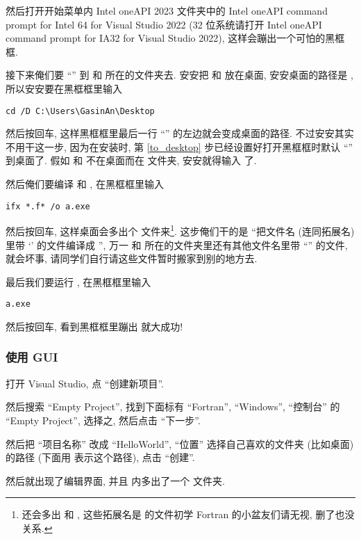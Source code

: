 然后打开开始菜单内 Intel oneAPI 2023 文件夹中的 Intel oneAPI command prompt for Intel 64 for Visual Studio 2022 (32 位系统请打开 Intel oneAPI command prompt for IA32 for Visual Studio 2022), 这样会蹦出一个可怕的黑框框.

接下来俺们要 ``'' 到  和  所在的文件夹去. 安安把  和  放在桌面, 安安桌面的路径是 , 所以安安要在黑框框里输入
\begin{verbatim}
cd /D C:\Users\GasinAn\Desktop
\end{verbatim}
然后按回车, 这样黑框框里最后一行 ``\ttt{>}'' 的左边就会变成桌面的路径. 不过安安其实不用干这一步, 因为在安装时, 第 \ref{to_desktop} 步已经设置好打开黑框框时默认 ``'' 到桌面了. 假如  和  不在桌面而在  文件夹, 安安就得输入  了.

然后俺们要编译  和 , 在黑框框里输入
\begin{verbatim}
ifx *.f* /o a.exe
\end{verbatim}
然后按回车, 这样桌面会多出个  文件来\footnote{还会多出  和 , 这些拓展名是  的文件初学 Fortran 的小盆友们请无视, 删了也没关系.}. 这步俺们干的是 ``把文件名 (连同拓展名) 里带 `' 的文件编译成 '', 万一  和  所在的文件夹里还有其他文件名里带 ``'' 的文件, 就会坏事, 请同学们自行请这些文件暂时搬家到别的地方去.

最后我们要运行 , 在黑框框里输入
\begin{verbatim}
a.exe
\end{verbatim}
然后按回车, 看到黑框框里蹦出  就大成功!

\subsubsection{使用 GUI}

打开 Visual Studio, 点 ``创建新项目''.

然后搜索 ``Empty Project'', 找到下面标有 ``Fortran'', ``Windows'', ``控制台'' 的 ``Empty Project'', 选择之, 然后点击 ``下一步''.

然后把 ``项目名称'' 改成 ``HelloWorld'', ``位置'' 选择自己喜欢的文件夹 (比如桌面) 的路径 (下面用 \ttt{[dir]} 表示这个路径), 点击 ``创建''.

然后就出现了编辑界面, 并且 \ttt{[dir]} 内多出了一个  文件夹.

